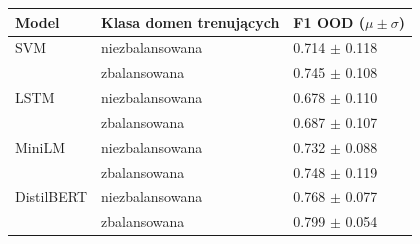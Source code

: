 \begin{tabularx}{\textwidth}{@{}lXY@{}}
\hline
Model & Klasa domen trenuj\k{a}cych & F1 OOD ($\mu\pm\sigma$) \\
\hline
SVM & niezbalansowana & 0.714 $\pm$ 0.118 \\
 & zbalansowana & 0.745 $\pm$ 0.108 \\
LSTM & niezbalansowana & 0.678 $\pm$ 0.110 \\
 & zbalansowana & 0.687 $\pm$ 0.107 \\
MiniLM & niezbalansowana & 0.732 $\pm$ 0.088 \\
 & zbalansowana & 0.748 $\pm$ 0.119 \\
DistilBERT & niezbalansowana & 0.768 $\pm$ 0.077 \\
 & zbalansowana & 0.799 $\pm$ 0.054 \\
\hline
\end{tabularx}
